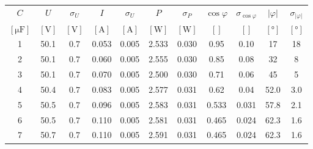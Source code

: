 \begin{tabular}{
    S[table-format=1.0]
    S[table-format=2.1]
    S[table-format=1.1]
    S[table-format=1.3]
    S[table-format=1.3]
    S[table-format=1.3]
    S[table-format=1.3]
    S[table-format=1.2]
    S[table-format=1.2]
    S[table-format=2.1]
    S[table-format=2.1]
} \toprule
{$C$}                   & {$U$}            & {$\sigma_U$}     & {$I$}              & {$\sigma_U$}       & {$P$}            & {$\sigma_P$}     & {$\cos \varphi$} & {$\sigma_{\cos \varphi}$} & {$|\varphi|$}      & {$\sigma_{|\varphi|}$} \\
{$[\si{\micro\farad}]$} & {$[\si{\volt}]$} & {$[\si{\volt}]$} & {$[\si{\ampere}]$} & {$[\si{\ampere}]$} & {$[\si{\watt}]$} & {$[\si{\watt}]$} & {$[]$}           & {$[]$}                    & {$[\si{\degree}]$} & {$[\si{\degree}]$}     \\                        & 50.1             & 0.7              & 0.053              & 0.005              & 2.533            & 0.030            & 0.95             & 0.10                      & 17                 & 18                     \\
2                       & 50.1             & 0.7              & 0.060              & 0.005              & 2.555            & 0.030            & 0.85             & 0.08                      & 32                 & 8                      \\
3                       & 50.1             & 0.7              & 0.070              & 0.005              & 2.500            & 0.030            & 0.71             & 0.06                      & 45                 & 5                      \\
4                       & 50.4             & 0.7              & 0.083              & 0.005              & 2.577            & 0.031            & 0.62             & 0.04                      & 52.0               & 3.0                    \\
5                       & 50.5             & 0.7              & 0.096              & 0.005              & 2.583            & 0.031            & 0.533            & 0.031                     & 57.8               & 2.1                    \\
6                       & 50.5             & 0.7              & 0.110              & 0.005              & 2.581            & 0.031            & 0.465            & 0.024                     & 62.3               & 1.6                    \\
7                       & 50.7             & 0.7              & 0.110              & 0.005              & 2.591            & 0.031            & 0.465            & 0.024                     & 62.3               & 1.6                    \\

\end{tabular}
